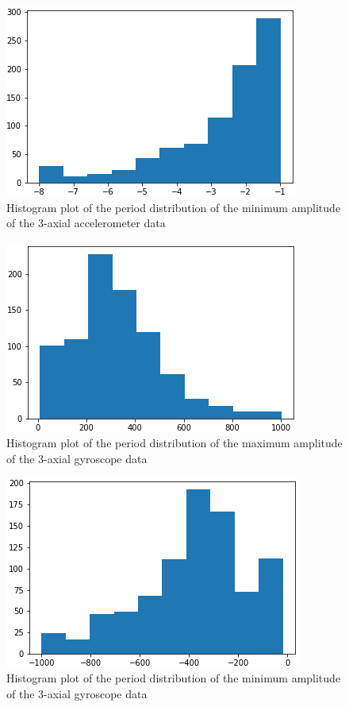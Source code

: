 \documentclass[conference]{IEEEtran}
\begin{document}
\begin{figure}[H]
\begin{center}
\includegraphics[scale=0.4]{amp_min_acc_hist.png}
\end{center}
\caption{\label{fig:amp_min_acc} 
Histogram plot of the period distribution of the minimum amplitude of the 3-axial accelerometer data}
\end{figure}
\begin{figure}[H]
\begin{center}
\includegraphics[scale=0.4]{amp_max_gyro_hist.png}
\end{center}
\caption{\label{fig:amp_max_gyro} 
Histogram plot of the period distribution of the maximum amplitude of the 3-axial gyroscope data}
\end{figure}
\begin{figure}[H]
\begin{center}
\includegraphics[scale=0.4]{amp_min_gyro_hist.png}
\end{center}
\caption{\label{fig:amp_min_gyro} 
Histogram plot of the period distribution of the minimum amplitude of the 3-axial gyroscope data}
\end{figure}
\end{document}
